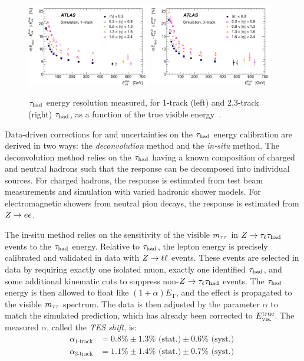\begin{figure}[tp]
  \centering
  \includegraphics[width=0.48\textwidth]{figures/PERF-2013-06/fig_16a}
  \includegraphics[width=0.48\textwidth]{figures/PERF-2013-06/fig_16b}
  \caption{$\tau_\text{had}$ energy resolution measured, for 1-track (left) and 2,3-track (right) $\tau_\text{had}$, as a function of the true visible energy~\cite{PERF-2013-06}.}
  \label{fig:taus-resolution}
\end{figure}

Data-driven corrections for and uncertainties on the $\tau_\text{had}$ energy calibration are derived in two ways: the \textit{deconvolution} method and the \textit{in-situ} method. The deconvolution method relies on the $\tau_\text{had}$ having a known composition of charged and neutral hadrons such that the response can be decomposed into individual sources. For charged hadrons, the response is estimated from test beam measurements and simulation with varied hadronic shower models. For electromagnetic showers from neutral pion decays, the response is estimated from $Z \rightarrow ee$.

The in-situ method relies on the sensitivity of the visible $m_{\tau\tau}$ in $Z\rightarrow\tau_\ell\tau_\text{had}$ events to the $\tau_\text{had}$ energy. Relative to $\tau_\text{had}$, the lepton energy is precisely calibrated and validated in data with $Z \rightarrow \ell\ell$ events. These events are selected in data by requiring exactly one isolated muon, exactly one identified $\tau_\text{had}$, and some additional kinematic cuts to suppress non-$Z\rightarrow\tau_\ell\tau_\text{had}$ events. The $\tau_\text{had}$ energy is then allowed to float like $(1 + \alpha)E_\text{T}$, and the effect is propagated to the visible $m_{\tau\tau}$ spectrum. The data is then adjusted by the parameter $\alpha$ to match the simulated prediction, which has already been corrected to $E_\text{vis.}^\text{true}$. The measured $\alpha$, called the \textit{TES shift}, is:
%
\begin{equation}
  \begin{split}
    \alpha_\text{1-track} &= 0.8\% \pm 1.3\% \text{ (stat.)} \pm 0.6\% \text{ (syst.) } \\
    \alpha_\text{3-track} &= 1.1\% \pm 1.4\% \text{ (stat.)} \pm 0.7\% \text{ (syst.) } \\
  \end{split}
  \label{eqn:taus-tesshift}
\end{equation}
%

